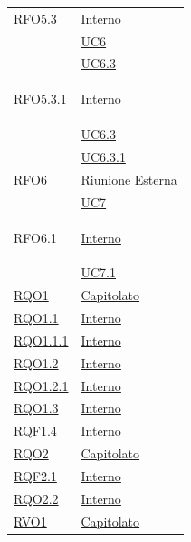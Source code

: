 \begin{longtable}{|>{\centering}m{5cm}|m{5cm}<{\centering}|}
\hypertarget{RFO5.3}{RFO5.3} &  \hyperlink{Interno}{Interno}\\
& \hyperref[UC6]{UC6}\\ 
& \hyperref[UC6.3]{UC6.3}\\ \hline

\hypertarget{RFO5.3.1}{RFO5.3.1} &  \hyperlink{Interno}{Interno}\\
& \hyperref[UC6.3]{UC6.3}\\ 
& \hyperref[UC6.3.1]{UC6.3.1}\\ \hline

\hyperlink{RFO6}{RFO6} & \hyperlink{Riunione Esterna}{Riunione Esterna}\\
& \hyperref[UC7]{UC7}\\ \hline

\hypertarget{RFO6.1}{RFO6.1} & \hyperlink{Interno}{Interno}\\
& \hyperref[UC7.1]{UC7.1}\\ \hline

\hyperlink{RQO1}{RQO1} & \hyperlink{Capitolato}{Capitolato}\\ \hline

\hyperlink{RQO1.1}{RQO1.1} & \hyperlink{Interno}{Interno}\\ \hline

\hyperlink{RQO1.1.1}{RQO1.1.1} & \hyperlink{Interno}{Interno}\\ \hline

\hyperlink{RQO1.2}{RQO1.2} & \hyperlink{Interno}{Interno}\\ \hline

\hyperlink{RQO1.2.1}{RQO1.2.1} & \hyperlink{Interno}{Interno}\\ \hline

\hyperlink{RQO1.3}{RQO1.3} & \hyperlink{Interno}{Interno}\\ \hline

\hyperlink{RQF1.4}{RQF1.4} & \hyperlink{Interno}{Interno}\\ \hline

\hyperlink{RQO2}{RQO2} & \hyperlink{Capitolato}{Capitolato}\\ \hline

\hyperlink{RQF2.1}{RQF2.1} & \hyperlink{Interno}{Interno}\\ \hline

\hyperlink{RQO2.2}{RQO2.2} & \hyperlink{Interno}{Interno}\\ \hline

\hyperlink{RVO1}{RVO1} & \hyperlink{Capitolato}{Capitolato}\\ \hline


\end{longtable}
